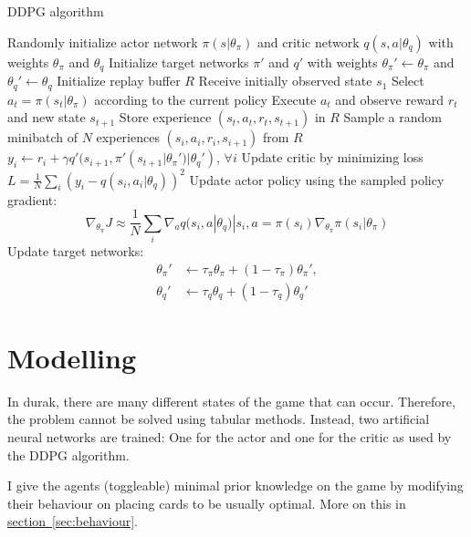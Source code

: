 \documentclass[a4paper,titlepage]{article}
\begin{document}
\begin{algorithm}
  \caption{DDPG algorithm}
  \label{alg:ddpg}
  \begin{algorithmic}
    \State Randomly initialize actor network $\pi(s | \theta_\pi)$ and critic network $q(s, a | \theta_q)$ with weights $\theta_\pi$ and $\theta_q$
    \State Initialize target networks $\pi'$ and $q'$ with weights $\theta_\pi' \gets \theta_\pi$ and $\theta_q' \gets \theta_q$
    \State Initialize replay buffer $R$
      Receive initially observed state $s_1$
	      \State Select $a_t = \pi(s_t | \theta_\pi)$ according to the current policy
	      \State Execute $a_t$ and observe reward $r_t$ and new state $s_{t+1}$
	      \State Store experience $(s_t, a_t, r_t, s_{t+1})$ in $R$
	      \State Sample a random minibatch of $N$ experiences $(s_i, a_i, r_i, s_{i+1})$ from $R$
	      \State $y_i \gets r_i + \gamma q'(s_{i+1}, \pi'(s_{t+1} | \theta_\pi') | \theta_q')$, $\forall i$
	      \State Update critic by minimizing loss $L = \frac{1}{N} \sum_i (y_i - q(s_i, a_i | \theta_q))^2$
	      \State Update actor policy using the sampled policy gradient:
	      \begin{equation*}
	        \nabla_{\theta_\pi} J \approx \frac{1}{N} \sum_i \nabla_a q(s_i, a | \theta_q) | s_i, a = \pi(s_i) \nabla_{\theta_\pi} \pi(s_i | \theta_\pi)
	      \end{equation*}
	      \State Update target networks:
	      \begin{align*}
	        \theta_\pi' &\gets \tau_\pi \theta_\pi + (1 - \tau_\pi) \theta_\pi', \\
	        \theta_q' &\gets \tau_q \theta_q + (1 - \tau_q) \theta_q'
	      \end{align*}
	    \EndFor
	  \EndFor
  \end{algorithmic}
\end{algorithm}

\newpage

\section{Modelling}

In durak, there are many different states of the game that can occur. Therefore, the problem cannot be solved using tabular methods. Instead, two artificial neural networks are trained: One for the actor and one for the critic as used by the DDPG algorithm.

I give the agents (toggleable) minimal prior knowledge on the game by modifying their behaviour on placing cards to be usually optimal. More on this in \hyperref[sec:behaviour]{section~\ref*{sec:behaviour}}.
\end{document}
